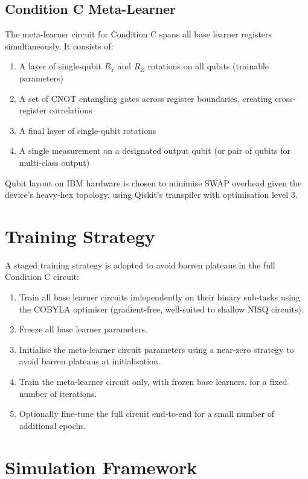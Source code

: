 \documentclass[]{UCD_CS_FYP_Report}
\begin{document}
\subsection{Condition C Meta-Learner}
The meta-learner circuit for Condition C spans all base learner registers simultaneously. It consists of:
\begin{enumerate}
    \item A layer of single-qubit $R_Y$ and $R_Z$ rotations on all qubits (trainable parameters)
    \item A set of CNOT entangling gates across register boundaries, creating cross-register correlations
    \item A final layer of single-qubit rotations
    \item A single measurement on a designated output qubit (or pair of qubits for multi-class output)
\end{enumerate}
Qubit layout on IBM hardware is chosen to minimise SWAP overhead given the device's heavy-hex topology, using Qiskit's transpiler with optimisation level 3.

\section{Training Strategy}

A staged training strategy is adopted to avoid barren plateaus in the full Condition C circuit:

\begin{enumerate}
    \item Train all base learner circuits independently on their binary sub-tasks using the COBYLA optimiser (gradient-free, well-suited to shallow NISQ circuits).
    \item Freeze all base learner parameters.
    \item Initialise the meta-learner circuit parameters using a near-zero strategy to avoid barren plateaus at initialisation.
    \item Train the meta-learner circuit only, with frozen base learners, for a fixed number of iterations.
    \item Optionally fine-tune the full circuit end-to-end for a small number of additional epochs.
\end{enumerate}

\section{Simulation Framework}
\end{document}
